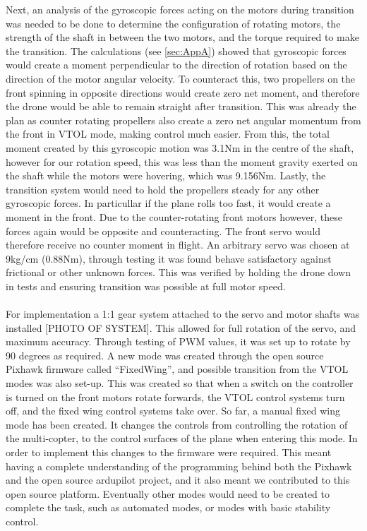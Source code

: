 Next, an analysis of the gyroscopic forces acting on the motors during transition was needed to be done to determine the configuration of rotating motors, the strength of the shaft in between the two motors, and the torque required to make the transition. The calculations (see \ref{sec:AppA}) showed that gyroscopic forces would create a moment perpendicular to the direction of rotation based on the direction of the motor angular velocity. To counteract this, two propellers on the front spinning in opposite directions would create zero net moment, and therefore the drone would be able to remain straight after transition. This was already the plan as counter rotating propellers also create a zero net angular momentum from the front in VTOL mode, making control much easier.  From this, the total moment created by this gyroscopic motion was 3.1Nm in the centre of the shaft, however for our rotation speed, this was less than the moment gravity exerted on the shaft while the motors were hovering, which was 9.156Nm. Lastly, the transition system would need to hold the propellers steady for any other gyroscopic forces. In particullar if the plane rolls too fast, it would create a moment in the front. Due to the counter-rotating front motors however, these forces again would be opposite and counteracting. The front servo would therefore receive no counter moment in flight. An arbitrary servo was chosen at 9kg/cm (0.88Nm), through testing it was found behave satisfactory against frictional or other unknown forces. This was verified by holding the drone down in tests and ensuring transition was possible at full motor speed.
\\\\
For implementation a 1:1 gear system attached to the servo and motor shafts was installed \color{red}[PHOTO OF SYSTEM]\color{black}. This allowed for full rotation of the servo, and maximum accuracy.  Through testing of PWM values, it was set up to rotate by 90 degrees as required. A new mode was created through the open source Pixhawk firmware called “FixedWing”, and possible transition from the VTOL modes was also set-up. This was created so that when a switch on the controller is turned on the front motors rotate forwards, the VTOL control systems turn off, and the fixed wing control systems take over. So far, a manual fixed wing mode has been created. It changes the controls from controlling the rotation of the multi-copter, to the control surfaces of the plane when entering this mode. In order to implement this changes to the firmware were required.  This meant having  a complete understanding of the programming behind both the Pixhawk and the open source ardupilot project, and it also meant we contributed to this open source platform. Eventually other modes would need to be created to complete the task, such as automated modes, or modes with basic stability control. 



